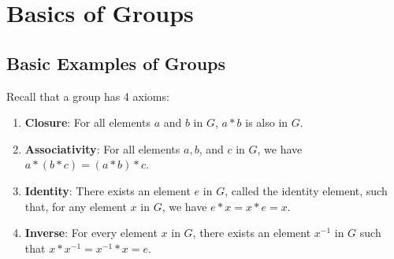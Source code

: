 



\chapter{Basics of Groups}
\section{Basic Examples of Groups}
Recall that a group has 4 axioms:
\begin{enumerate}
    \item \textbf{Closure}: For all elements $a$ and $b$ in $G$, $a \ast b$ is also in $G$.
    \item \textbf{Associativity}: For all elements $a, b$, and $c$ in $G$, we have $a \ast (b \ast c) = (a \ast b) \ast c$.
    \item \textbf{Identity}: There exists an element $e$ in $G$, called the identity element, such that, for any element $x$ in $G$, we have $e \ast x = x \ast e = x$.
    \item \textbf{Inverse}: For every element $x$ in $G$, there exists an element $x^{-1}$ in $G$ such that $x \ast x^{-1} = x^{-1} \ast x = e$.
\end{enumerate}

